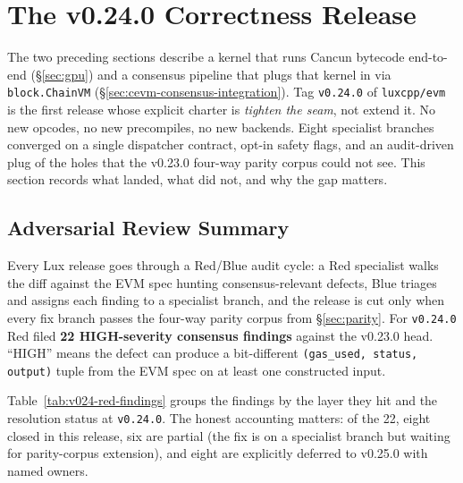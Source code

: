 \section{The v0.24.0 Correctness Release}

\label{sec:v024}

The two preceding sections describe a kernel that runs Cancun bytecode
end-to-end (\S\ref{sec:gpu}) and a consensus pipeline that plugs that
kernel in via \texttt{block.ChainVM} (\S\ref{sec:cevm-consensus-integration}).
Tag \texttt{v0.24.0} of \texttt{luxcpp/evm} is the first release whose
explicit charter is \emph{tighten the seam}, not extend it. No new opcodes,
no new precompiles, no new backends. Eight specialist branches converged
on a single dispatcher contract, opt-in safety flags, and an audit-driven
plug of the holes that the v0.23.0 four-way parity corpus could not see.
This section records what landed, what did not, and why the gap matters.

\subsection{Adversarial Review Summary}
\label{sec:v024:adversarial}

Every Lux release goes through a Red/Blue audit cycle: a Red specialist
walks the diff against the EVM spec hunting consensus-relevant defects,
Blue triages and assigns each finding to a specialist branch, and the
release is cut only when every fix branch passes the four-way parity
corpus from \S\ref{sec:parity}. For \texttt{v0.24.0} Red filed
\textbf{22 HIGH-severity consensus findings} against the v0.23.0 head.
``HIGH'' means the defect can produce a bit-different
\texttt{(gas\_used, status, output)} tuple from the EVM spec on at least
one constructed input.

Table~\ref{tab:v024-red-findings} groups the findings by the layer they
hit and the resolution status at \texttt{v0.24.0}. The honest accounting
matters: of the 22, eight closed in this release, six are partial (the
fix is on a specialist branch but waiting for parity-corpus extension),
and eight are explicitly deferred to v0.25.0 with named owners.

